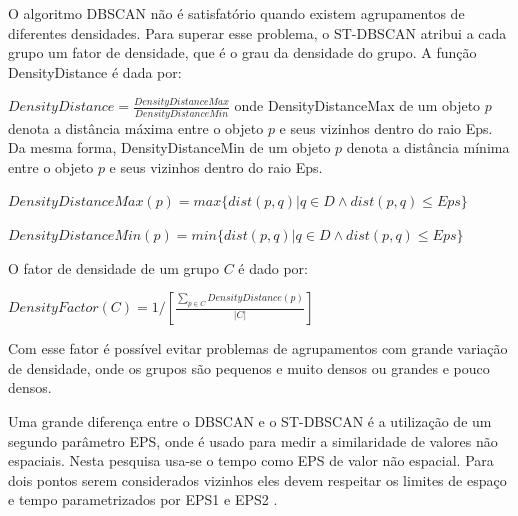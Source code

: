 O algoritmo \acrshort{DBSCAN} não é satisfatório quando existem agrupamentos de diferentes densidades. Para superar esse problema, o \acrshort{ST-DBSCAN} atribui a cada grupo um fator de densidade, que é o grau da densidade do grupo.
A função DensityDistance é dada por:

${DensityDistance = \frac{DensityDistanceMax}{DensityDistanceMin}}$
\linebreak
onde DensityDistanceMax de um objeto ${p}$ denota a distância máxima entre o objeto ${p}$ e seus vizinhos dentro do raio Eps. Da mesma forma, DensityDistanceMin de um objeto ${p}$ denota a distância mínima entre o objeto ${p}$ e seus vizinhos dentro do raio Eps.

${DensityDistanceMax(p) = max\big\{ dist(p, q) | q \in D \wedge dist(p, q)  \leqslant Eps\big\} }$

${DensityDistanceMin(p) = min\big\{ dist(p, q) | q \in D \wedge dist(p, q)  \leqslant Eps\big\} }$
\linebreak

O fator de densidade de um grupo ${C}$ é dado por:

${DensityFactor(C) = 1\big/\left [   \frac{\sum_{p\in C}DensityDistance(p)}{|C|} \right ]}$
\linebreak

Com esse fator é possível evitar problemas de agrupamentos com grande variação de densidade, onde os grupos são pequenos e muito densos ou grandes e pouco densos.

Uma grande diferença entre o \acrshort{DBSCAN} e o \acrshort{ST-DBSCAN} é a utilização de um segundo parâmetro EPS, onde é usado para medir a similaridade de valores não espaciais. Nesta pesquisa usa-se o tempo como EPS de valor não espacial. Para dois pontos serem considerados vizinhos eles devem respeitar os limites de espaço e tempo parametrizados por EPS1 e EPS2 \cite{Birant2007STDBSCANAA}.

